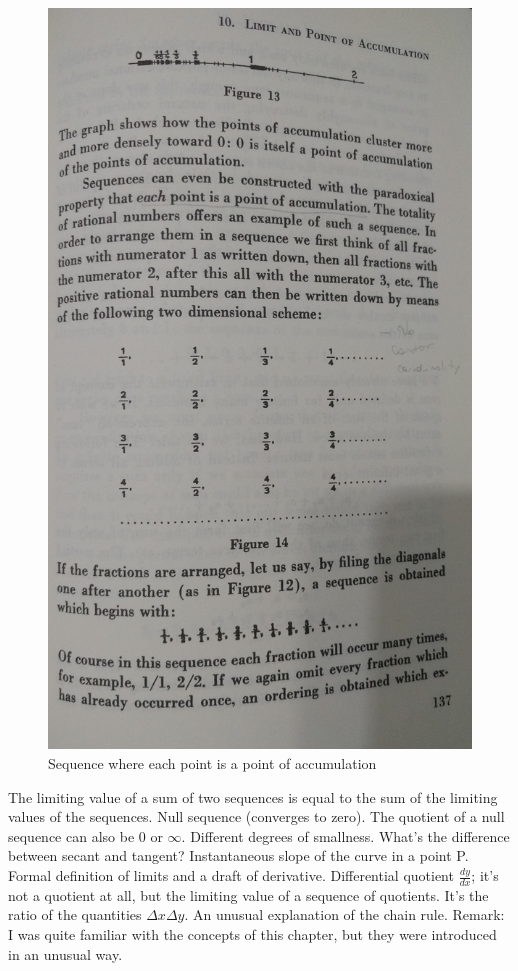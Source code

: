 \documentclass{cornell}
\begin{document}
\begin{figure}[!t]
\centering
\includegraphics[width=1.0\linewidth]{images/fig003.jpg}
\caption{Sequence where each point is a point of accumulation }
\label{fig03}
\end{figure}

%
{The limiting value of a sum of two sequences is equal to the sum of the limiting values of the sequences. Null sequence (converges to zero). The quotient of a null sequence can also be 0 or \( \infty \). Different degrees of smallness. What's the difference between secant and tangent? Instantaneous slope of the curve in a point P. Formal definition of limits and a draft of derivative. Differential quotient \( \frac{dy}{dx} \); it's not a quotient at all, but the limiting value of a sequence of quotients. It's the ratio of the quantities \( \Delta x \Delta y \). An unusual explanation of the chain rule.}%
{Remark: I was quite familiar with the concepts of this chapter, but they were introduced in an unusual way.}%
\end{document}
